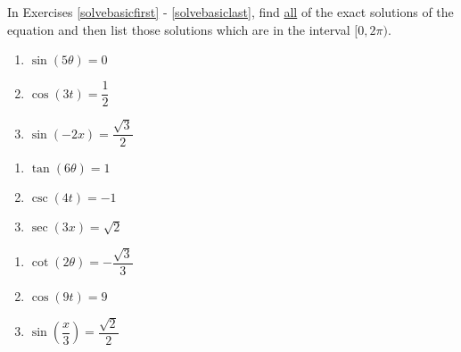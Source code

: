 \documentclass{ximera}
\begin{document}
	\author{Stitz-Zeager}



In Exercises \ref{solvebasicfirst} - \ref{solvebasiclast}, find \underline{all} of the exact solutions of the  equation and then list those solutions which are in the interval $[0, 2\pi)$.

\begin{multicols}{3}

\begin{enumerate}

\item $\sin \left( 5 \theta \right) = 0$  \label{solvebasicfirst}
\item $\cos \left( 3t \right) = \dfrac{1}{2}$ 
\item $\sin \left( -2x \right) = \dfrac{\sqrt{3}}{2}$ 

\setcounter{HW}{\value{enumi}}

\end{enumerate}

\end{multicols}

\begin{multicols}{3}

\begin{enumerate}

\setcounter{enumi}{\value{HW}}

\item $\tan \left( 6 \theta \right) = 1$
\item $\csc \left( 4 t \right) = -1$
\item $\sec \left( 3x \right) = \sqrt{2}$

\setcounter{HW}{\value{enumi}}

\end{enumerate}

\end{multicols}

\begin{multicols}{3}

\begin{enumerate}

\setcounter{enumi}{\value{HW}}

\item $\cot \left( 2 \theta \right) = -\dfrac{\sqrt{3}}{3}$
\item $\cos \left( 9t  \right) = 9$ 
\item $\sin \left( \dfrac{x}{3} \right) = \dfrac{\sqrt{2}}{2}$

\setcounter{HW}{\value{enumi}}

\end{enumerate}

\end{multicols}
\end{document}
